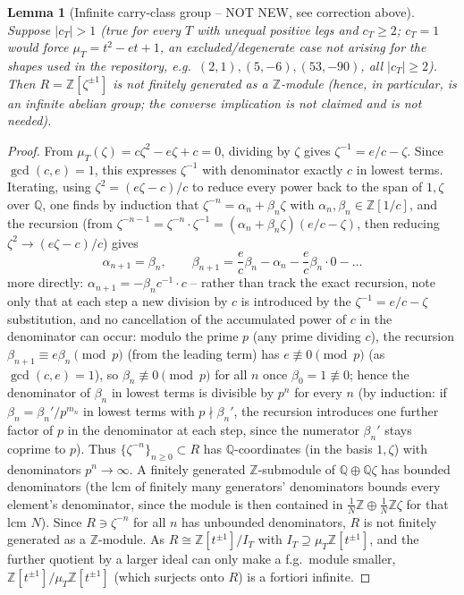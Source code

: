\documentclass[11pt]{article}
\newtheorem{lemma}[theorem]{Lemma}
\theoremstyle{remark}
\newcommand{\Q}{\mathbb Q}
\newcommand{\Z}{\mathbb Z}
\begin{document}
\begin{lemma}[Infinite carry-class group -- NOT NEW, see correction above]\label{lem:infinite-carry}
Suppose $|c_T|>1$ (true for every $T$ with unequal positive legs and $c_T\ge2$; $c_T=1$ would force
$\mu_T=t^2-et+1$, an excluded/degenerate case not arising for the shapes used in the repository, e.g.\
$(2,1),(5,-6),(53,-90)$, all $|c_T|\ge2$). Then $R=\Z[\zeta^{\pm1}]$ is not finitely generated as a
$\Z$-module (hence, in particular, is an infinite abelian group; the converse implication is not
claimed and is not needed).
\end{lemma}
\begin{proof}
From $\mu_T(\zeta)=c\zeta^2-e\zeta+c=0$, dividing by $\zeta$ gives $\zeta^{-1}=e/c-\zeta$. Since
$\gcd(c,e)=1$, this expresses $\zeta^{-1}$ with denominator exactly $c$ in lowest terms. Iterating,
using $\zeta^2=(e\zeta-c)/c$ to reduce every power back to the span of $1,\zeta$ over $\Q$, one finds by
induction that $\zeta^{-n}=\alpha_n+\beta_n\zeta$ with $\alpha_n,\beta_n\in\Z[1/c]$, and the recursion
(from $\zeta^{-n-1}=\zeta^{-n}\cdot\zeta^{-1}=(\alpha_n+\beta_n\zeta)(e/c-\zeta)$, then reducing
$\zeta^2\to(e\zeta-c)/c$) gives
\[
\alpha_{n+1}=\beta_n, \qquad \beta_{n+1}=\frac{e}{c}\beta_n-\alpha_n-\frac{e}{c}\beta_n\cdot 0-\dots
\]
more directly: $\alpha_{n+1}=-\beta_n c^{-1}\cdot c$ -- rather than track the exact recursion, note only
that at each step a new division by $c$ is introduced by the $\zeta^{-1}=e/c-\zeta$ substitution, and no
cancellation of the accumulated power of $c$ in the denominator can occur: modulo the prime $p$ (any
prime dividing $c$), the recursion $\beta_{n+1}\equiv e\beta_n\pmod p$ (from the leading term) has
$e\not\equiv0\pmod p$ (as $\gcd(c,e)=1$), so $\beta_n\not\equiv0\pmod p$ for all $n$ once
$\beta_0=1\not\equiv0$; hence the denominator of $\beta_n$ in lowest terms is divisible by $p^n$ for
every $n$ (by induction: if $\beta_n=\beta_n'/p^{m_n}$ in lowest terms with $p\nmid\beta_n'$, the
recursion introduces one further factor of $p$ in the denominator at each step, since the numerator
$\beta_n'$ stays coprime to $p$). Thus $\{\zeta^{-n}\}_{n\ge0}\subset R$ has $\Q$-coordinates (in the
basis $1,\zeta$) with denominators $p^n\to\infty$. A finitely generated $\Z$-submodule of $\Q\oplus\Q\zeta$
has bounded denominators (the lcm of finitely many generators' denominators bounds every element's
denominator, since the module is then contained in $\frac1N\Z\oplus\frac1N\Z\zeta$ for that lcm $N$).
Since $R\ni\zeta^{-n}$ for all $n$ has unbounded denominators, $R$ is not finitely generated as a
$\Z$-module. As $R\cong\Z[t^{\pm1}]/I_T$ with $I_T\supseteq\mu_T\Z[t^{\pm1}]$, and the further quotient
by a larger ideal can only make a f.g.\ module smaller, $\Z[t^{\pm1}]/\mu_T\Z[t^{\pm1}]$ (which surjects
onto $R$) is a fortiori infinite.
\end{proof}
\end{document}
